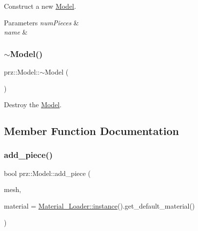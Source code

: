 Construct a new \mbox{\hyperlink{classprz_1_1_model}{Model}}. 


\begin{DoxyParams}{Parameters}
{\em num\+Pieces} & \\
\hline
{\em name} & \\
\hline
\end{DoxyParams}
\mbox{\label{classprz_1_1_model_a80543f3a7b7034799221143c28fc8dab}} 
\subsubsection{\texorpdfstring{$\sim$Model()}{~Model()}}
{\footnotesize\ttfamily prz\+::\+Model\+::$\sim$\+Model (\begin{DoxyParamCaption}{ }\end{DoxyParamCaption})\hspace{0.3cm}{\ttfamily [inline]}}



Destroy the \mbox{\hyperlink{classprz_1_1_model}{Model}}. 



\subsection{Member Function Documentation}
\mbox{\label{classprz_1_1_model_a462a854cd7ca40a0484e23d92c64deb9}} 
\subsubsection{\texorpdfstring{add\_piece()}{add\_piece()}}
{\footnotesize\ttfamily bool prz\+::\+Model\+::add\+\_\+piece (\begin{DoxyParamCaption}\item[{P\+S\+Ptr$<$ \mbox{\hyperlink{classprz_1_1_mesh}{Mesh}} $>$}]{mesh,  }\item[{P\+S\+Ptr$<$ \mbox{\hyperlink{classprz_1_1_material}{Material}} $>$}]{material = {\ttfamily \mbox{\hyperlink{classprz_1_1_material___loader_a5fa3903db95525602037c029debb6532}{Material\+\_\+\+Loader\+::instance}}().get\+\_\+default\+\_\+material()} }\end{DoxyParamCaption})\hspace{0.3cm}{\ttfamily [inline]}}



